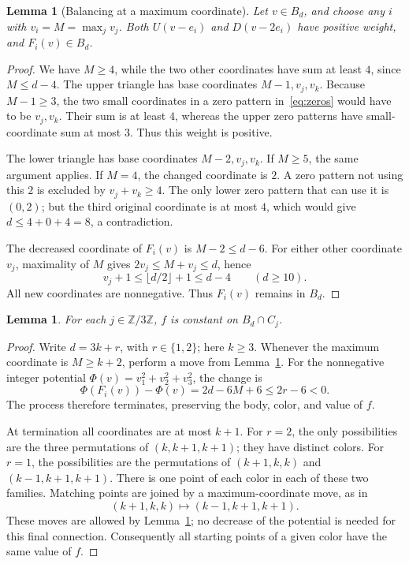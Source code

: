 \documentclass[11pt]{article}
\newtheorem{lemma}[theorem]{Lemma}
\newcommand{\Z}{\mathbb Z}
\begin{document}
\begin{lemma}[Balancing at a maximum coordinate]\label{lem:move}
Let \(v\in B_d\), and choose any \(i\) with \(v_i=M=\max_j v_j\).
Both \(U(v-e_i)\) and \(D(v-2e_i)\) have positive weight, and
\(F_i(v)\in B_d\).
\end{lemma}

\begin{proof}
We have \(M\geq4\), while the two other coordinates have sum at least
\(4\), since \(M\leq d-4\).
The upper triangle has base coordinates \(M-1,v_j,v_k\).
Because \(M-1\geq3\), the two small coordinates in a zero pattern
in~\eqref{eq:zeros} would have to be \(v_j,v_k\).
Their sum is at least \(4\), whereas the upper zero patterns have
small-coordinate sum at most \(3\). Thus this weight is positive.

The lower triangle has base coordinates \(M-2,v_j,v_k\).
If \(M\geq5\), the same argument applies.
If \(M=4\), the changed coordinate is \(2\).
A zero pattern not using this \(2\) is excluded by
\(v_j+v_k\geq4\).
The only lower zero pattern that can use it is \((0,2)\);
but the third original coordinate is at most \(4\), which would give
\(d\leq4+0+4=8\), a contradiction.

The decreased coordinate of \(F_i(v)\) is \(M-2\leq d-6\).
For either other coordinate \(v_j\), maximality of \(M\) gives
\(2v_j\leq M+v_j\leq d\), hence
\[
 v_j+1\leq\lfloor d/2\rfloor+1\leq d-4
 \qquad(d\geq10).
\]
All new coordinates are nonnegative. Thus \(F_i(v)\) remains in \(B_d\).
\end{proof}

\begin{lemma}\label{lem:constant}
For each \(j\in\Z/3\Z\), \(f\) is constant on \(B_d\cap C_j\).
\end{lemma}

\begin{proof}
Write \(d=3k+r\), with \(r\in\{1,2\}\); here \(k\geq3\).
Whenever the maximum coordinate is \(M\geq k+2\), perform a move
from Lemma~\ref{lem:move}. For the nonnegative integer potential
\(\Phi(v)=v_1^2+v_2^2+v_3^2\), the change is
\[
 \Phi(F_i(v))-\Phi(v)=2d-6M+6\leq2r-6<0.
\]
The process therefore terminates, preserving the body, color, and
value of \(f\).

At termination all coordinates are at most \(k+1\).
For \(r=2\), the only possibilities are the three permutations of
\((k,k+1,k+1)\); they have distinct colors.
For \(r=1\), the possibilities are the permutations of
\((k+1,k,k)\) and \((k-1,k+1,k+1)\).
There is one point of each color in each of these two families.
Matching points are joined by a maximum-coordinate move, as in
\[
 (k+1,k,k)\longmapsto(k-1,k+1,k+1).
\]
These moves are allowed by Lemma~\ref{lem:move}; no decrease of the
potential is needed for this final connection.
Consequently all starting points of a given color have the same
value of \(f\).
\end{proof}
\end{document}
